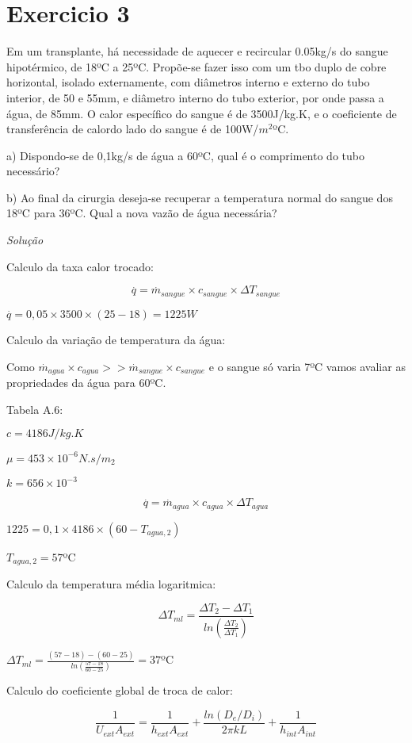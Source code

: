 \section{Exercicio 3}
Em um transplante, há necessidade de aquecer e recircular 0.05kg/s do sangue hipotérmico, de 18ºC a 25ºC. Propõe-se fazer isso com um tbo duplo de cobre horizontal, isolado externamente, com diâmetros interno e externo do tubo interior, de 50 e 55mm, e diâmetro interno do tubo exterior, por onde passa a água, de 85mm. O calor específico do sangue é de 3500J/kg.K, e o coeficiente de transferência de calordo lado do sangue é de 100W/$m^2$ºC.

a) Dispondo-se de 0,1kg/s de água a 60ºC, qual é o comprimento do tubo necessário?

b) Ao final da cirurgia deseja-se recuperar a temperatura normal do sangue dos 18ºC para 36ºC. Qual a nova vazão de água necessária?

\textit{Solução}

Calculo da taxa calor trocado:

\[\stackrel{.}{q} = \stackrel{.}{m}_{sangue}\times c_{sangue} \times \Delta T_{sangue}\]

$\stackrel{.}{q} = 0,05 \times 3500 \times (25 - 18) = 1225W$

Calculo da variação de temperatura da água:

Como $\stackrel{.}{m}_{agua}\times c_{agua} >> \stackrel{.}{m}_{sangue}\times c_{sangue}$ e o sangue só varia 7ºC vamos avaliar as propriedades da água para 60ºC.

Tabela A.6:

$c = 4186J/kg.K$

$\mu = 453\times 10^{-6}N.s/m_2$

$k = 656\times 10^{-3}$

\[\stackrel{.}{q} = \stackrel{.}{m}_{agua}\times c_{agua} \times \Delta T_{agua}\]

$1225 = 0,1\times 4186\times ( 60 - T_{agua,2} )$

$T_{agua,2} = 57$ºC

Calculo da temperatura média logaritmica:

\[\Delta T_{ml}= \frac{\Delta T_2 - \Delta T_1}{ln\left(\frac{\Delta T_2}{\Delta T_1}\right)}\]

$\Delta T_{ml}= \frac{(57-18) - (60-25)}{ln\left(\frac{57-18}{60-25}\right)}= 37$ºC

Calculo do coeficiente global de troca de calor:

\[\frac{1}{U_{ext}A_{ext}}=\frac{1}{h_{ext}A_{ext}} + \frac{ln(D_{e}/D_{i})}{2\pi kL} + \frac{1}{h_{int}A_{int}}\]

